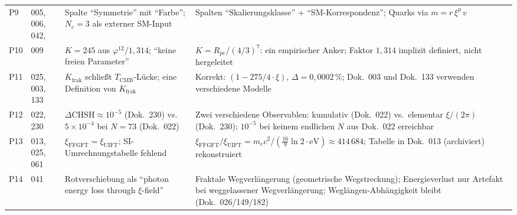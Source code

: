 \begin{center}
{{\begin{tabular}{p{0.5cm}p{2.4cm}p{4.4cm}p{4.4cm}}
P9 & 005, 006, 042, \newline 046 &
  Spalte \enquote{Symmetrie} mit \enquote{Farbe}; \newline
  $N_c = 3$ als externer SM-Input &
  Spalten \enquote{Skalierungs\-klasse} + \enquote{SM-Korrespondenz}; \newline
  Quarks via $m = r\,\xi^p\,v$ \\[3pt]
P10 & 009 &
  $K = 245$ aus $\varphi^{12}/1{,}314$; \newline
  \enquote{keine freien Parameter} &
  $K = R_{pe}/(4/3)^7$: ein empirischer Anker; \newline
  Faktor $1{,}314$ implizit definiert, nicht hergeleitet \\[3pt]
P11 & 025, 003, 133 &
  $K_\text{frak}$ schließt $T_\text{CMB}$-Lücke; \newline
  eine Definition von $K_\text{frak}$ &
  Korrekt: $(1-275/4\cdot\xi)$, $\Delta=0{,}0002\,\%$; \newline
  Dok.~003 und Dok.~133 verwenden verschiedene Modelle \\[3pt]
P12 & 022, 230 &
  $\Delta\text{CHSH} \approx 10^{-5}$ (Dok.~230) vs.\
  $5\times10^{-4}$ bei $N=73$ (Dok.~022) &
  Zwei verschiedene Observablen: kumulativ (Dok.~022) vs.\ elementar $\xi/(2\pi)$ (Dok.~230);
  $10^{-5}$ bei keinem endlichen $N$ aus Dok.~022 erreichbar \\[3pt]
P13 & 013, 025, 061 &
  $\xi_\text{FFGFT} = \xi_\text{UIFT}$; \newline
  SI-Umrechnungstabelle fehlend &
  $\xi_\text{FFGFT}/\xi_\text{UIFT} = m_ec^2/(\frac{16}{9}\ln 2\cdot\text{eV}) \approx 414\,684$; \newline
  Tabelle in Dok.~013 (archiviert) rekonstruiert \\[3pt]
P14 & 041 &
  Rotverschiebung als \enquote{photon energy loss through $\xi$-field} &
  Fraktale Wegverlängerung (geometrische Wegstreckung); Energieverlust nur Artefakt bei weggelassener Wegverlängerung; Weglängen-Abhängigkeit bleibt (Dok.~026/149/182) \\
\bottomrule
\end{tabular}
}
}
\end{center}
